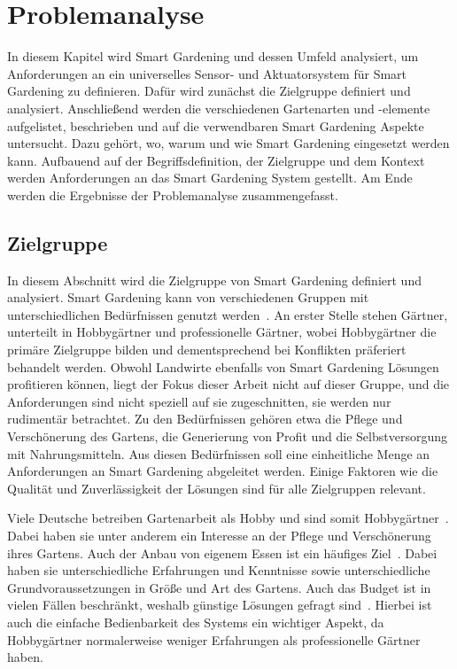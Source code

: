 \chapter{Problemanalyse}\label{ch:analyse}
In diesem Kapitel wird Smart Gardening und dessen Umfeld analysiert, um Anforderungen an ein universelles Sensor- und Aktuatorsystem für Smart Gardening zu definieren.
Dafür wird zunächst die Zielgruppe definiert und analysiert.
Anschließend werden die verschiedenen Gartenarten und -elemente aufgelistet, beschrieben und auf die verwendbaren Smart Gardening Aspekte untersucht.
Dazu gehört, wo, warum und wie Smart Gardening eingesetzt werden kann.
Aufbauend auf der Begriffsdefinition, der Zielgruppe und dem Kontext werden Anforderungen an das Smart Gardening System gestellt.
Am Ende werden die Ergebnisse der Problemanalyse zusammengefasst.



\section{Zielgruppe}
In diesem Abschnitt wird die Zielgruppe von Smart Gardening definiert und analysiert.
Smart Gardening kann von verschiedenen Gruppen mit unterschiedlichen Bedürfnissen genutzt werden~\cite{IoTFarming, SmartGardeningBeliebt}.
An erster Stelle stehen Gärtner, unterteilt in Hobbygärtner und professionelle Gärtner, wobei Hobbygärtner die primäre Zielgruppe bilden und dementsprechend bei Konflikten präferiert behandelt werden.
Obwohl Landwirte ebenfalls von Smart Gardening Lösungen profitieren können, liegt der Fokus dieser Arbeit nicht auf dieser Gruppe, und die Anforderungen sind nicht speziell auf sie zugeschnitten, sie werden nur rudimentär betrachtet.
Zu den Bedürfnissen gehören etwa die Pflege und Verschönerung des Gartens, die Generierung von Profit und die Selbstversorgung mit Nahrungsmitteln.
Aus diesen Bedürfnissen soll eine einheitliche Menge an Anforderungen an Smart Gardening abgeleitet werden.
Einige Faktoren wie die Qualität und Zuverlässigkeit der Lösungen sind für alle Zielgruppen relevant.

Viele Deutsche betreiben Gartenarbeit als Hobby und sind somit Hobbygärtner~\cite{GartenHobby}.
Dabei haben sie unter anderem ein Interesse an der Pflege und Verschönerung ihres Gartens.
Auch der Anbau von eigenem Essen ist ein häufiges Ziel~\cite{Gartenfavoriten}.
Dabei haben sie unterschiedliche Erfahrungen und Kenntnisse sowie unterschiedliche Grundvoraussetzungen in Größe und Art des Gartens.
Auch das Budget ist in vielen Fällen beschränkt, weshalb günstige Lösungen gefragt sind~\cite{GartenAusgaben}.
Hierbei ist auch die einfache Bedienbarkeit des Systems ein wichtiger Aspekt, da Hobbygärtner normalerweise weniger Erfahrungen als professionelle Gärtner haben.

